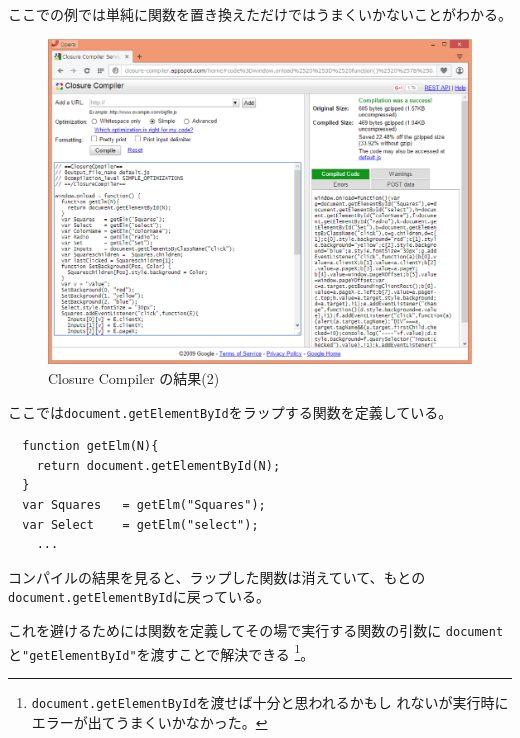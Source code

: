 ここでの例では単純に関数を置き換えただけではうまくいかないことがわかる。
 \begin{figure}[ht]
	\begin{center}
	 \includegraphics[width=1\textwidth]{10-01closur-compiler-res02.eps}
	\end{center}
 \caption{Closure Compiler の結果(2)}\label{closure-compiler-res02}
 \end{figure}

 ここでは\texttt{document.getElementById}をラップする関数を定義している。
 \begin{verbatim}
  function getElm(N){
    return document.getElementById(N);
  }
  var Squares   = getElm("Squares");
  var Select    = getElm("select");
	...
 \end{verbatim}
 コンパイルの結果を見ると、ラップした関数は消えていて、もとの\\
 \texttt{document.getElementById}に戻っている。

 これを避けるためには関数を定義してその場で実行する関数の引数に
 \texttt{document}と\texttt{"getElementById"}を渡すことで解決できる
 \footnote{\texttt{document.getElementById}を渡せば十分と思われるかもし
 れないが実行時にエラーが出てうまくいかなかった。}。

